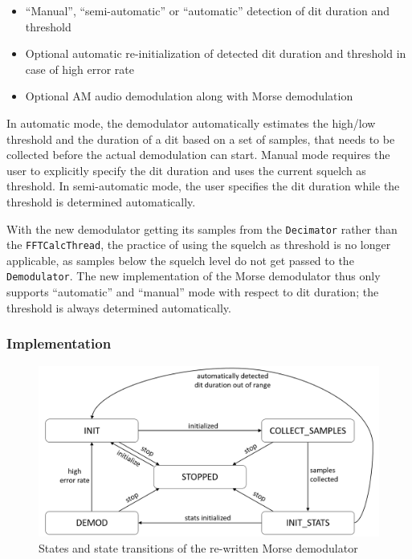\begin{itemize}
  \item ``Manual'', ``semi-automatic'' or ``automatic'' detection of dit duration and threshold
  \item Optional automatic re-initialization of detected dit duration and threshold in case of high error rate
  \item Optional \ac{AM} audio demodulation along with Morse demodulation
\end{itemize}

In automatic mode, the demodulator automatically estimates the high/low threshold and the duration of a dit based on a set of samples, that needs to be collected before the actual demodulation can start. Manual mode requires the user to explicitly specify the dit duration and uses the current squelch as threshold. In semi-automatic mode, the user specifies the dit duration while the threshold is determined automatically.

With the new demodulator getting its samples from the \texttt{Decimator} rather than the \texttt{FFTCalcThread}, the practice of using the squelch as threshold is no longer applicable, as samples below the squelch level do not get passed to the \texttt{Demodulator}. The new implementation of the Morse demodulator thus only supports ``automatic'' and ``manual'' mode with respect to dit duration; the threshold is always determined automatically.


\subsubsection{Implementation}

\begin{figure}
	\centering
	\includegraphics[width=1\linewidth]{gfx/morse_states.png}
	\caption{States and state transitions of the re-written Morse demodulator}
	\label{fig:morse_states}
\end{figure}

